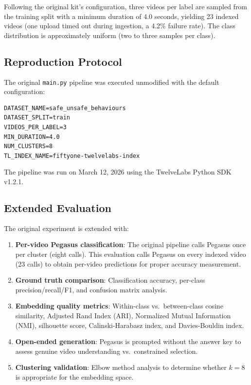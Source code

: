 \documentclass[11pt,a4paper]{article}
\begin{document}
Following the original kit's configuration, three videos per label are sampled from the training split with a minimum duration of 4.0 seconds, yielding 23 indexed videos (one upload timed out during ingestion, a 4.2\% failure rate). The class distribution is approximately uniform (two to three samples per class).

\subsection{Reproduction Protocol}

The original \texttt{main.py} pipeline was executed unmodified with the default configuration:

\begin{verbatim}
DATASET_NAME=safe_unsafe_behaviours
DATASET_SPLIT=train
VIDEOS_PER_LABEL=3
MIN_DURATION=4.0
NUM_CLUSTERS=8
TL_INDEX_NAME=fiftyone-twelvelabs-index
\end{verbatim}

The pipeline was run on March 12, 2026 using the TwelveLabs Python SDK v1.2.1.

\subsection{Extended Evaluation}

The original experiment is extended with:

\begin{enumerate}[nosep]
    \item \textbf{Per-video Pegasus classification}: The original pipeline calls Pegasus once per cluster (eight calls). This evaluation calls Pegasus on every indexed video (23 calls) to obtain per-video predictions for proper accuracy measurement.
    \item \textbf{Ground truth comparison}: Classification accuracy, per-class precision/recall/F1, and confusion matrix analysis.
    \item \textbf{Embedding quality metrics}: Within-class vs.\ between-class cosine similarity, Adjusted Rand Index (ARI), Normalized Mutual Information (NMI), silhouette score, Calinski-Harabasz index, and Davies-Bouldin index.
    \item \textbf{Open-ended generation}: Pegasus is prompted without the answer key to assess genuine video understanding vs.\ constrained selection.
    \item \textbf{Clustering validation}: Elbow method analysis to determine whether $k{=}8$ is appropriate for the embedding space.
\end{enumerate}
\end{document}
